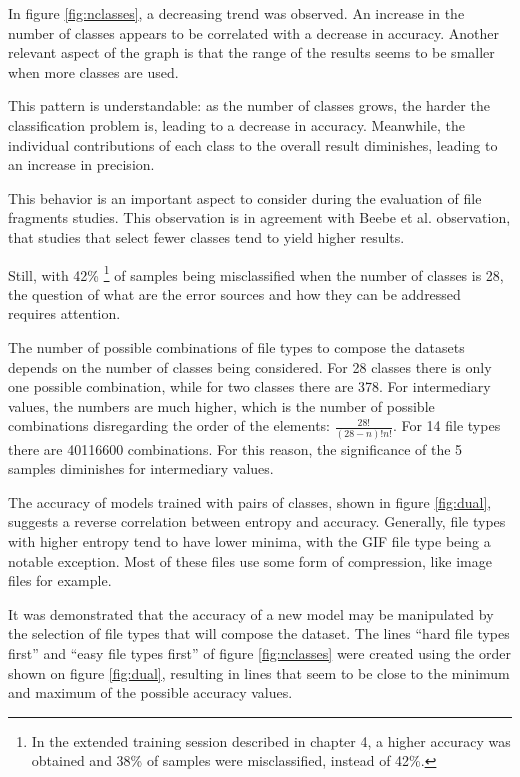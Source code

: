 

In figure \ref{fig:nclasses}, a decreasing trend was observed. An increase in the number of classes appears to be  correlated with a decrease in accuracy. Another relevant aspect of the graph is that the range of the results seems to be smaller when more classes are used.  

This pattern is understandable: as the number of classes grows, the harder the classification problem is, leading to a decrease in accuracy. Meanwhile, the individual contributions of each class to the overall result diminishes, leading to an increase in precision.

This behavior is an important aspect to consider during the evaluation of file fragments studies. This observation is in agreement with Beebe et al. \cite{beebe_sceadan:_2013} observation, that studies that select fewer classes tend to yield higher results. 

Still, with 42\% \footnote{In the extended training session described in chapter 4, a higher accuracy was obtained and 38\% of samples were misclassified, instead of 42\%.} of samples being misclassified when the number of classes is 28, the question of what are the error sources and how they can be addressed requires attention.

The number of possible combinations of file types to compose the datasets depends on the number of classes being considered. For 28 classes there is only one possible combination, while for two classes there are 378. For intermediary values, the numbers are much higher, which is the number of possible combinations disregarding the order of the elements: $ \frac{28!}{(28-n)!n!}$. For 14 file types there are 40116600 combinations. For this reason, the significance of the 5 samples diminishes for intermediary values.


The accuracy of models trained with pairs of classes, shown in figure \ref{fig:dual}, suggests a reverse correlation between entropy and accuracy.  Generally, file types with higher entropy tend to have lower minima, with the GIF file type being a notable exception. Most of these files use some form of compression, like image files for example.

It was demonstrated that the accuracy of a new model may be manipulated by the selection of file types that will compose the dataset. The lines ``hard file types first'' and ``easy file types first'' of figure \ref{fig:nclasses} were created using the order shown on figure \ref{fig:dual}, resulting in lines that seem to be close to the minimum and maximum of the possible accuracy values. 

